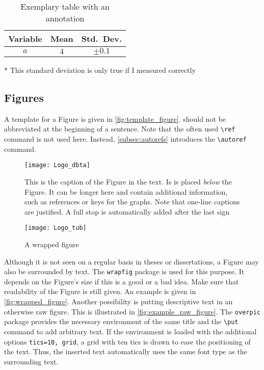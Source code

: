 \begin{table}[tbh]
	\centering
	\caption{Exemplary table with an annotation}\label{tab:threeparttable}
	\begin{threeparttable}
		\begin{tabular}{c c c}
			\toprule
			Variable & Mean      & Std.~Dev.               \\
			\midrule
			$a$      & $\num{4}$ & $\pm\num{0.1}$\tnote{*} \\
			\bottomrule
		\end{tabular}
		\begin{tablenotes}\footnotesize
			\item[*] This standard deviation is only true if I measured correctly
		\end{tablenotes}
	\end{threeparttable}
	\label{table2}
\end{table}

\subsection{Figures}
A template for a Figure is given in \autoref{fig:template_figure}.  should not be abbreviated at the beginning of a sentence. Note that the often used \verb+\ref+ command is not used here. Instead, \autoref{subsec:autorefs} introduces the \verb+\autoref+ command. 
\begin{figure}[h]
\centering
\texttt{[image: Logo\_dbta]}
\caption[This is the caption in the List of Figures]{This is the caption of the Figure in the text. Is is placed \emph{below} the Figure. It can be longer here and contain additional information, such as references or keys for the graphs. Note that one-line captions are justified. A full stop is automatically added after the last sign}\label{fig:template_figure}
\end{figure}

\begin{wrapfigure}{r}{0.4\textwidth}
\centering
\texttt{[image: Logo\_tub]}
\caption{A wrapped figure}\label{fig:wrapped_figure}
\end{wrapfigure}
Although it is not seen on a regular basis in theses or dissertations, a Figure may also be surrounded by text. The \verb+wrapfig+ package is used for this purpose. It depends on the Figure's size if this is a good or a bad idea. Make sure that readability of the Figure is still given. An example is given in \autoref{fig:wrapped_figure}. Another possibility is putting descriptive text in an otherwise raw figure. This is illustrated in \autoref{fig:example_raw_figure}. The \verb+overpic+ package provides the necessary environment of the same title and the \verb+\put+ command to add arbitrary text. If the environment is loaded with the additional options \verb+tics=10, grid+, a grid with ten tics is drawn to ease the positioning of the text. Thus, the inserted text automatically uses the same font type as the surrounding text.

